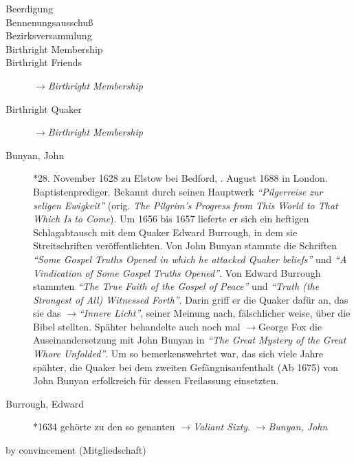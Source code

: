 \begin{description}
 \item[Beerdigung]

 \item[Bennenungsausschuß]
 
 \item[Bezirksversammlung]
 \item[Birthright Membership]
 \item[Birthright Friends] $\to$\textit{Birthright Membership}
 \item[Birthright Quaker] $\to$\textit{Birthright Membership}

 \item[Bunyan, John] $\ast$28. November 1628 zu Elstow bei Bedford, . August 1688 in London. Baptistenprediger. Bekannt durch seinen Hauptwerk \textit{"`Pilgerreise zur seligen Ewigkeit"'} (orig. \textit{The Pilgrim’s Progress from This World to That Which Is to Come}). Um 1656 bis 1657 lieferte er sich ein heftigen Schlagabtausch mit dem Quaker Edward Burrough, in dem sie Streitschriften veröffentlichten. Von John Bunyan stammte die Schriften \textit{"`Some Gospel Truths Opened in which he attacked Quaker beliefs"'} und \textit{"`A Vindication of Some Gospel Truths Opened"'}. Von Edward Burrough stammten \textit{"`The True Faith of the Gospel of Peace"'} und \textit{"`Truth (the Strongest of All) Witnessed Forth"'}. Darin griff er die Quaker dafür an, das sie das $\to$\textit{"`Innere Licht"'}, seiner Meinung nach, fälschlicher weise, über die Bibel stellten. Spähter behandelte auch noch mal $\to$George Fox die Auseinandersetzung mit John Bunyan in \textit{"`The Great Mystery of the Great Whore Unfolded"'}. Um so bemerkenswehrtet war, das sich viele Jahre spähter, die Quaker bei dem zweiten Gefängnisaufenthalt (Ab 1675) von John Bunyan erfolkreich für dessen Freilassung einsetzten.

 \item[Burrough, Edward] $\ast$1634  gehörte zu den so genanten $\to$\textit{Valiant Sixty}. $\to$\textit{Bunyan, John}
 \item[by convincement (Mitgliedschaft)]
 \end{description}

\normalsize

